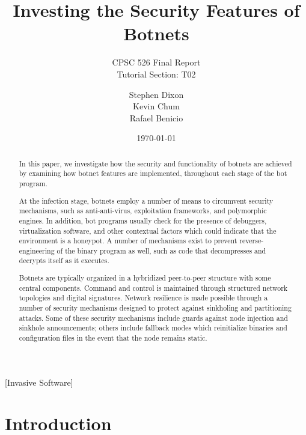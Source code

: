 \documentclass{acm_proc_article-sp}
\begin{document}
\title{Investing the Security Features of Botnets}
\subtitle{CPSC 526 Final Report \\ Tutorial Section: T02}
\date{\today}
\author{
\alignauthor
Stephen Dixon\\
\alignauthor
Kevin Chum\\
\alignauthor
Rafael Benicio\\
}

\maketitle

\begin{abstract}

In this paper, we investigate how the security and functionality of botnets are achieved by examining how botnet features are implemented, throughout each stage of the bot program.

At the infection stage, botnets employ a number of means to circumvent security mechanisms, such as anti-anti-virus, exploitation frameworks, and polymorphic engines.  In addition, bot programs usually check for the presence of debuggers, virtualization software, and other contextual factors which could indicate that the environment is a honeypot.  A number of mechanisms exist to prevent reverse-engineering of the binary program as well, such as code that decompresses and decrypts itself as it executes.

Botnets are typically organized in a hybridized peer-to-peer structure with some central components.  Command and control is maintained through structured network topologies and digital signatures.  Network resilience is made possible through a number of security mechanisms designed to protect against sinkholing and partitioning attacks.  Some of these security mechanisms include guards against node injection and sinkhole announcements; others include fallback modes which reinitialize binaries and configuration files in the event that the node remains static.


\end{abstract}
[Invasive Software]

\newpage
\section{Introduction}
\end{document}
